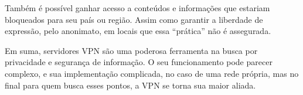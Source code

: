 \documentclass[12pt]{article}
\begin{document}
\begin{flushleft}
Também é possível ganhar acesso a conteúdos e informações que estariam bloqueados para seu país ou região. Assim como garantir a liberdade de expressão, pelo anonimato, em locais que essa “prática” não é assegurada. 

Em suma, servidores VPN são uma poderosa ferramenta na busca por privacidade e segurança de informação. O seu funcionamento pode parecer complexo, e sua implementação complicada, no caso de uma rede própria, mas no final para quem busca esses pontos, a VPN se torna sua maior aliada.






\cite{hostone:100}
\cite{stackexchange:101}
\cite{compugraf:103}
\cite{starti:104}

\end{flushleft}
\end{document}
